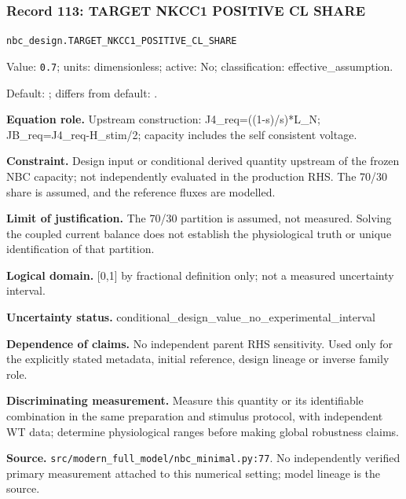 \subsubsection*{Record 113: TARGET NKCC1 POSITIVE CL SHARE}
{\small \nolinkurl{nbc_design.TARGET_NKCC1_POSITIVE_CL_SHARE}\par

Value: \texttt{0.7}; units: dimensionless; active: No; classification: effective\_assumption.\par

Default: ; differs from default: .\par

\textbf{Equation role.} Upstream construction: J4\_req=((1-s)/s)*L\_N; JB\_req=J4\_req-H\_stim/2; capacity includes the self consistent voltage.\par

\textbf{Constraint.} Design input or conditional derived quantity upstream of the frozen NBC capacity; not independently evaluated in the production RHS. The 70/30 share is assumed, and the reference fluxes are modelled.\par

\textbf{Limit of justification.} The 70/30 partition is assumed, not measured. Solving the coupled current balance does not establish the physiological truth or unique identification of that partition.\par

\textbf{Logical domain.} [0,1] by fractional definition only; not a measured uncertainty interval.\par

\textbf{Uncertainty status.} conditional\_design\_value\_no\_experimental\_interval\par

\textbf{Dependence of claims.} No independent parent RHS sensitivity. Used only for the explicitly stated metadata, initial reference, design lineage or inverse family role.\par

\textbf{Discriminating measurement.} Measure this quantity or its identifiable combination in the same preparation and stimulus protocol, with independent WT data; determine physiological ranges before making global robustness claims.\par

\textbf{Source.} \nolinkurl{src/modern_full_model/nbc_minimal.py:77}. No independently verified primary measurement attached to this numerical setting; model lineage is the source.\par}

